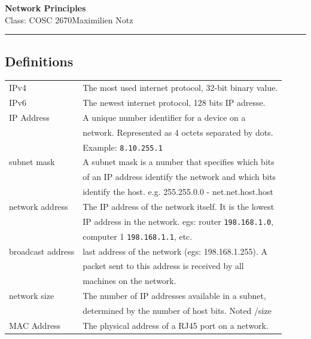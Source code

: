 \documentclass[5pt]{article}
\begin{document}
\begin{center}
     \Large{\textbf{Network Principles}}\\
     \footnotesize{Class: COSC 2670}\hfill\footnotesize{Maximilien Notz}
     \noindent\rule{20.2cm}{0.4pt}
\end{center}


\begin{multicols}{2}
\setcounter{secnumdepth}{0}

\subsection{Definitions}
\begin{tabular}{LL}
  IPv4                & The most used internet protocol, 32-bit binary value. \\
  IPv6                & The newest internet protocol, 128 bits IP adresse. \\
  IP Address          & A unique number identifier for a device on a \\
                      & network. Represented as 4 octets separated by dots. \\
                      & Example: \texttt{8.10.255.1} \\
  subnet mask         & A subnet mask is a number that specifies which bits\\
                      & of an IP address identify the network and which bits\\
                      & identify the host. e.g. 255.255.0.0 - net.net.host.host\\
  network address     & The IP address of the network itself. It is the lowest\\
                      & IP address in the network. egs: router \texttt{198.168.1.0},\\
                      & computer 1 \texttt{198.168.1.1}, etc. \\
  broadcast address   & last address of the network (egs: 198.168.1.255). A\\
                      & packet sent to this address is received by all\\
                      & machines on the network.\\ 
  network size        & The number of IP addresses available in a subnet,\\
                      & determined by the number of host bits. Noted /size\\
  MAC Address         & The physical address of a RJ45 port on a network.\\

\end{tabular}
\end{multicols}
\end{document}
